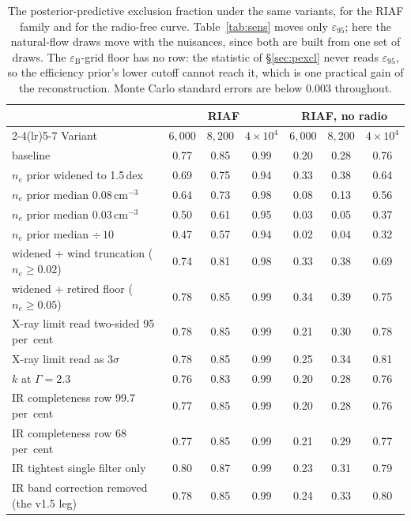 \documentclass[11pt]{article}
\newcommand{\eps}{\ensuremath{\varepsilon_{\mathrm{B}}}}
\newcommand{\epsl}{\ensuremath{\varepsilon_{95}}}
\begin{document}
\begin{table}[tbp]
\centering
\small
\caption{The posterior-predictive exclusion fraction under the same variants,
for the RIAF family and for the radio-free curve. Table~\ref{tab:sens} moves
only \epsl; here the natural-flow draws move with the nuisances, since both
are built from one set of draws. The $\eps$-grid floor has no row: the
statistic of \S\ref{sec:pexcl} never reads \epsl{}, so the efficiency prior's
lower cutoff cannot reach it, which is one practical gain of the
reconstruction. Monte Carlo standard errors are below 0.003 throughout.}
\label{tab:sensexcl}
\begin{tabular}{lcccccc}
\toprule
& \multicolumn{3}{c}{RIAF} & \multicolumn{3}{c}{RIAF, no radio} \\
\cmidrule(lr){2-4}\cmidrule(lr){5-7}
Variant & $6{,}000$ & $8{,}200$ & $4{\times}10^{4}$ & $6{,}000$ & $8{,}200$ & $4{\times}10^{4}$ \\
\midrule
baseline & 0.77 & 0.85 & 0.99 & 0.20 & 0.28 & 0.76 \\
$n_{e}$ prior widened to 1.5\,dex & 0.69 & 0.75 & 0.94 & 0.33 & 0.38 & 0.64 \\
$n_{e}$ prior median $0.08\,\mathrm{cm^{-3}}$ & 0.64 & 0.73 & 0.98 & 0.08 & 0.13 & 0.56 \\
$n_{e}$ prior median $0.03\,\mathrm{cm^{-3}}$ & 0.50 & 0.61 & 0.95 & 0.03 & 0.05 & 0.37 \\
$n_{e}$ prior median $\div\,10$ & 0.47 & 0.57 & 0.94 & 0.02 & 0.04 & 0.32 \\
widened + wind truncation ($n_{e} \geq 0.02$) & 0.74 & 0.81 & 0.98 & 0.33 & 0.38 & 0.69 \\
widened + retired floor ($n_{e} \geq 0.05$) & 0.78 & 0.85 & 0.99 & 0.34 & 0.39 & 0.75 \\
X-ray limit read two-sided 95\,per~cent & 0.78 & 0.85 & 0.99 & 0.21 & 0.30 & 0.78 \\
X-ray limit read as $3\sigma$ & 0.78 & 0.85 & 0.99 & 0.25 & 0.34 & 0.81 \\
$k$ at $\Gamma = 2.3$ & 0.76 & 0.83 & 0.99 & 0.20 & 0.28 & 0.76 \\
IR completeness row 99.7\,per~cent & 0.77 & 0.85 & 0.99 & 0.20 & 0.28 & 0.76 \\
IR completeness row 68\,per~cent & 0.77 & 0.85 & 0.99 & 0.21 & 0.29 & 0.77 \\
IR tightest single filter only & 0.80 & 0.87 & 0.99 & 0.23 & 0.31 & 0.79 \\
IR band correction removed (the v1.5 leg) & 0.78 & 0.85 & 0.99 & 0.24 & 0.33 & 0.80 \\

\end{tabular}
\end{table}
\end{document}
